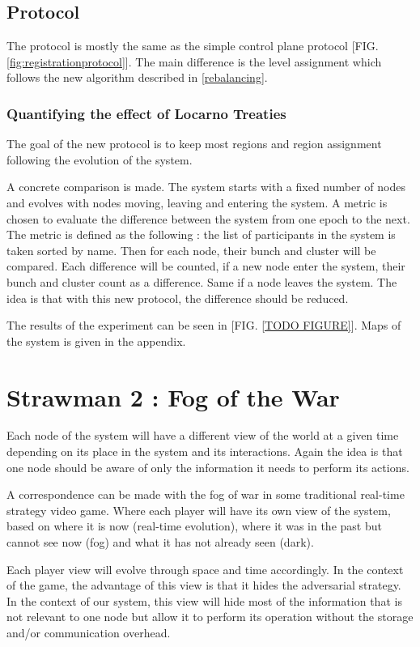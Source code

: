 \documentclass[a4paper,11pt,oneside]{report}
\begin{document}
\subsection{Protocol}
The protocol is mostly the same as the simple control plane protocol [FIG.
\ref{fig:registrationprotocol}]. The main difference is the level assignment
which follows the new algorithm described in \ref{rebalancing}. 

\subsubsection{Quantifying the effect of Locarno Treaties}
The goal of the new protocol is to keep most regions and region assignment
following the evolution of the system. 

A concrete comparison is made. The system starts with a fixed number of nodes
and evolves with nodes moving, leaving and entering the system. A metric is
chosen to evaluate the difference between the system from one epoch to the
next. The metric is defined as the following :  the list of participants in the
system is taken sorted by name. Then for each node, their bunch and cluster
will be compared. Each difference will be counted, if a new node enter the
system, their bunch and cluster count as a difference. Same if a node leaves
the system. The idea is that with this new protocol, the difference should be
reduced. 

The results of the experiment can be seen in [FIG. \ref{TODO FIGURE}]. Maps of
the system is given in the appendix.


\section{Strawman 2 : Fog of the War}

Each node of the system will have a different view of the world at a given time
depending on its place in the system and its interactions. Again the idea is
that one node should be aware of only the information it needs to perform its
actions. 

A correspondence can be made with the fog of war in some traditional real-time
strategy video game. Where each player will have its own view of the system,
based on where it is now (real-time evolution), where it was in the past but
cannot see now (fog) and what it has not already seen (dark).

Each player view will evolve through space and time accordingly. In the context
of the game, the advantage of this view is that it hides the adversarial
strategy. In the context of our system, this view will hide most of the
information that is not relevant to one node but allow it to perform its
operation without the storage and/or communication overhead. 
\end{document}
